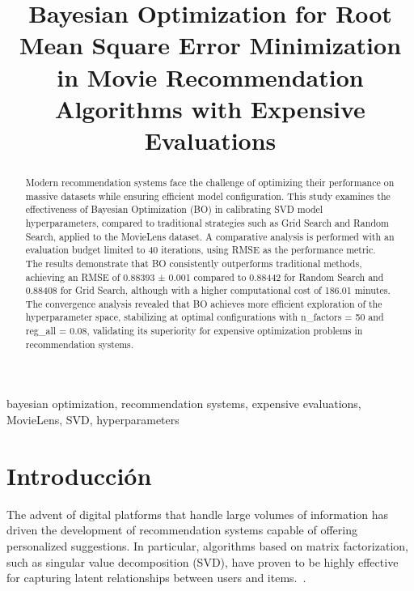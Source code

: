 \documentclass[conference]{IEEEtran}
\begin{document}
\title{Bayesian Optimization for Root Mean Square Error Minimization in Movie Recommendation Algorithms with Expensive Evaluations}

\author{
}

\maketitle

\begin{abstract}
Modern recommendation systems face the challenge of optimizing their performance on massive datasets while ensuring efficient model configuration. This study examines the effectiveness of Bayesian Optimization (BO) in calibrating SVD model hyperparameters, compared to traditional strategies such as Grid Search and Random Search, applied to the MovieLens dataset. A comparative analysis is performed with an evaluation budget limited to 40 iterations, using RMSE as the performance metric. The results demonstrate that BO consistently outperforms traditional methods, achieving an RMSE of 0.88393 ± 0.001 compared to 0.88442 for Random Search and 0.88408 for Grid Search, although with a higher computational cost of 186.01 minutes. The convergence analysis revealed that BO achieves more efficient exploration of the hyperparameter space, stabilizing at optimal configurations with n\_factors = 50 and reg\_all = 0.08, validating its superiority for expensive optimization problems in recommendation systems.

\end{abstract}

\begin{IEEEkeywords}
bayesian optimization, recommendation systems, expensive evaluations, MovieLens, SVD, hyperparameters
\end{IEEEkeywords}

\section{Introducción}

The advent of digital platforms that handle large volumes of information has driven the development of recommendation systems capable of offering personalized suggestions. In particular, algorithms based on matrix factorization, such as singular value decomposition (SVD), have proven to be highly effective for capturing latent relationships between users and items.~\cite{koren2009matrix}.
\end{document}
